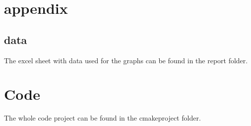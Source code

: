\documentclass[a4paper,10pt,titlepage]{report}
\begin{document}
\section{appendix}
\subsection{data}
The excel sheet with data used for the graphs can be found in the report folder.\\

\section{Code}
The whole code project can be found in the cmakeproject folder.
%

%
\end{document}
